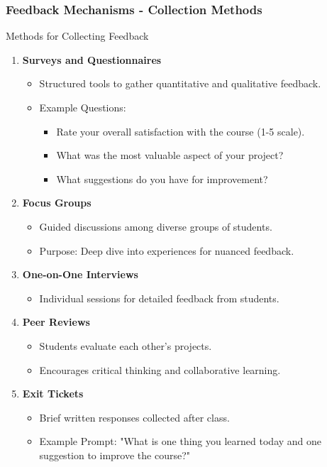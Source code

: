 \documentclass[aspectratio=169]{beamer}
\begin{document}
\begin{frame}[fragile]
    \frametitle{Feedback Mechanisms - Collection Methods}
    \begin{block}{Methods for Collecting Feedback}
        \begin{enumerate}
            \item \textbf{Surveys and Questionnaires}
                \begin{itemize}
                    \item Structured tools to gather quantitative and qualitative feedback.
                    \item Example Questions:
                        \begin{itemize}
                            \item Rate your overall satisfaction with the course (1-5 scale).
                            \item What was the most valuable aspect of your project?
                            \item What suggestions do you have for improvement?
                        \end{itemize}
                \end{itemize}
            \item \textbf{Focus Groups}
                \begin{itemize}
                    \item Guided discussions among diverse groups of students.
                    \item Purpose: Deep dive into experiences for nuanced feedback.
                \end{itemize}
            \item \textbf{One-on-One Interviews}
                \begin{itemize}
                    \item Individual sessions for detailed feedback from students.
                \end{itemize}
            \item \textbf{Peer Reviews}
                \begin{itemize}
                    \item Students evaluate each other’s projects.
                    \item Encourages critical thinking and collaborative learning.
                \end{itemize}
            \item \textbf{Exit Tickets}
                \begin{itemize}
                    \item Brief written responses collected after class.
                    \item Example Prompt: "What is one thing you learned today and one suggestion to improve the course?"
                \end{itemize}
        \end{enumerate}
    \end{block}
\end{frame}
\end{document}
